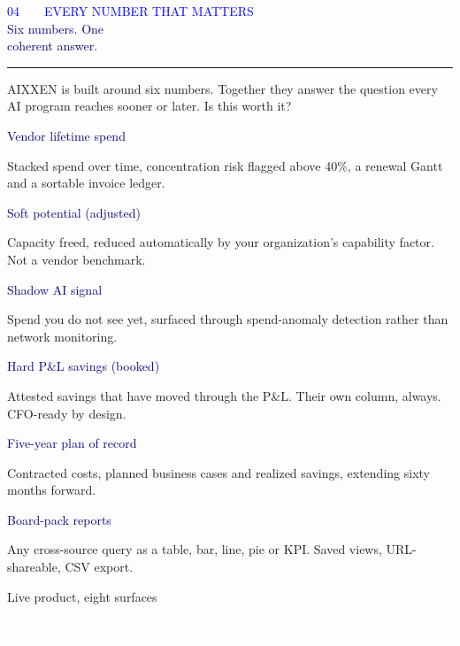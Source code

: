 \documentclass[10pt]{article}
\newcommand{\bodysize}{\fontsize{9.6}{15.2}\selectfont}
\newcommand{\sectionhead}[3]{%
  {\semibold\fontsize{8}{8}\selectfont\textcolor{blue}{#1\ \ \textbullet\ \ \MakeUppercase{#2}}}\\[5pt]
  {\black\fontsize{25}{28}\selectfont\textcolor{navy}{#3}}\\[6pt]
  {\color{blue}\rule{40pt}{2.8pt}}\par\vspace{14pt}}
\newcommand{\lead}[1]{{\medium\fontsize{11.5}{16}\selectfont\textcolor{slate}{#1}\par}}
\newcommand{\cardtitle}[1]{{\heavy\fontsize{10.5}{12}\selectfont\textcolor{navy}{#1}\par\vspace{3pt}}}
\begin{document}
\sectionhead{04}{Every Number That Matters}{Six numbers. One\\coherent answer.}

\lead{AIXXEN is built around six numbers. Together they answer the question every AI program reaches sooner or later. Is this worth it?}
\vspace{16pt}

\newcommand{\sixtile}[2]{%
\begin{tile}
\cardtitle{#1}
{\fontsize{8.5}{12}\selectfont\textcolor{slate}{#2}}
\end{tile}}

\begin{minipage}[t]{0.485\textwidth}
\sixtile{Vendor lifetime spend}{Stacked spend over time, concentration risk flagged above 40\%, a renewal Gantt and a sortable invoice ledger.}
\vspace{9pt}
\sixtile{Soft potential (adjusted)}{Capacity freed, reduced automatically by your organization's capability factor. Not a vendor benchmark.}
\vspace{9pt}
\sixtile{Shadow AI signal}{Spend you do not see yet, surfaced through spend-anomaly detection rather than network monitoring.}
\end{minipage}\hfill
\begin{minipage}[t]{0.485\textwidth}
\sixtile{Hard P\&L savings (booked)}{Attested savings that have moved through the P\&L. Their own column, always. CFO-ready by design.}
\vspace{9pt}
\sixtile{Five-year plan of record}{Contracted costs, planned business cases and realized savings, extending sixty months forward.}
\vspace{9pt}
\sixtile{Board-pack reports}{Any cross-source query as a table, bar, line, pie or KPI. Saved views, URL-shareable, CSV export.}
\end{minipage}

\vspace{18pt}
\begin{blueblock}
{\heavy\fontsize{11}{14}\selectfont Live product, eight surfaces}\\[3pt]
{\bodysize\textcolor{white}{Every surface draws from the same data model, so the dashboard, the vendor ledger, the roadmap and the reports never disagree.}}
\end{blueblock}
\newpage
\end{document}
